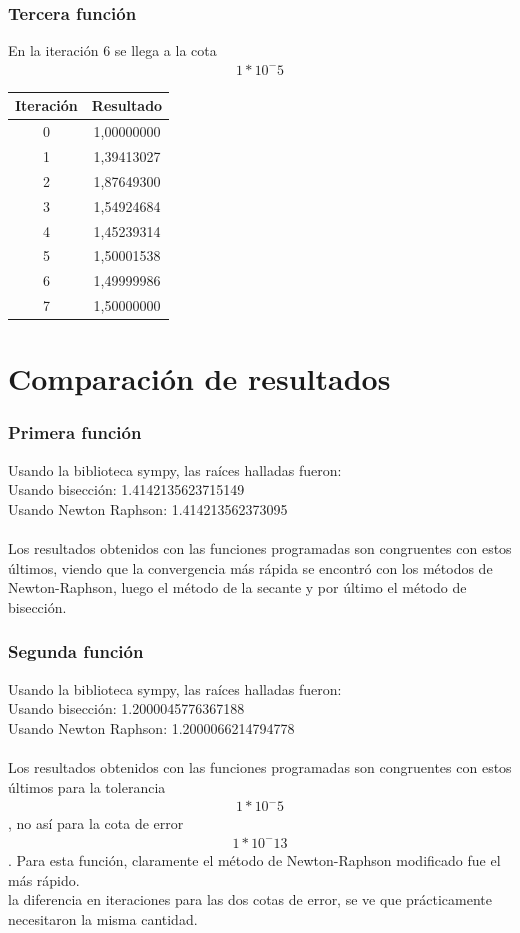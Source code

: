 \documentclass[titlepage,a4paper]{article}
\begin{document}
\subsubsection{Tercera función}\label{sec:sec3}
En la iteración 6 se llega a la cota \begin{align}1*10^-5
\end{align}
\begin{tabular}{| c | c |}
\hline
 Iteración & Resultado \\ \hline
    0     & 1,00000000 \\
    1     & 1,39413027 \\
    2     & 1,87649300 \\
    3     & 1,54924684 \\
    4     & 1,45239314 \\
    5     & 1,50001538 \\
    6     & 1,49999986 \\
    7     & 1,50000000 \\
\hline
\end{tabular}

\section{Comparación de resultados}\label{sec:comparacion_resultados}
\subsubsection{Primera función}\label{sec:CR1}
Usando la biblioteca sympy, las raíces halladas fueron:
\\Usando bisección:  1.4142135623715149
\\Usando Newton Raphson:  1.414213562373095
\\\\Los resultados obtenidos con las funciones programadas son congruentes con estos últimos, viendo que la convergencia más rápida se encontró con los métodos de Newton-Raphson, luego el método de la secante y por último el método de bisección.
\subsubsection{Segunda función}\label{sec:CR2}
Usando la biblioteca sympy, las raíces halladas fueron:
\\Usando bisección:  1.2000045776367188
\\Usando Newton Raphson:  1.2000066214794778
\\\\Los resultados obtenidos con las funciones programadas son congruentes con estos últimos para la tolerancia \begin{align}1*10^-5
\end{align}, no así para la cota de error \begin{align}1*10^-13
\end{align}. Para esta función, claramente el método de Newton-Raphson modificado fue el más rápido. 
\\\Analizando la diferencia en iteraciones para las dos cotas de error, se ve que prácticamente necesitaron la misma cantidad.
\end{document}

